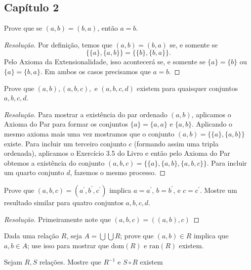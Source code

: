 \documentclass[a4paper]{article}
\begin{document}
\subsection{Capítulo 2}
\setcounter{theorem}{0}
\begin{exercicio}
Prove que se \((a,b)=(b,a)\), então \(a=b\).
\end{exercicio}
\begin{proof}[Resolução]
  Por definição, temos que \((a,b)=(b,a)\) se, e somente se
  \[\{\{a\},\{a,b\}\}=\{\{b\},\{b,a\}\}.\]
  Pelo Axioma da Extensionalidade, isso acontecerá se, e somente se
  \(\{a\}=\{b\}\) ou \(\{a\}=\{b,a\}\). Em ambos os casos precisamos que \(a=b\).
\end{proof}
\begin{exercicio}
  Prove que \((a,b),(a,b,c),\) e \((a,b,c,d)\) existem para quaisquer conjuntos \(a,b,c,d\).
\end{exercicio}
\begin{proof}[Resolução]
Para mostrar a existência do par ordenado \((a,b)\), aplicamos o Axioma do Par
para formar os conjuntos \(\{a\}=\{a,a\}\) e \(\{a,b\}\). Aplicando o mesmo
axioma mais uma vez mostramos que o conjunto \((a,b)=\{\{a\},\{a,b\}\}\) existe.
Para incluir um terceiro conjunto \(c\) (formando assim uma tripla ordenada),
aplicamos o Exercício 3.5 do Livro e então pelo Axioma do Par obtemos a
existência do conjunto \((a,b,c)=\{\{a\},\{a,b\},\{a,b,c\}\}\). Para incluir um quarto
conjunto \(d\), fazemos o mesmo processo.
\end{proof}
\begin{exercicio}
  Prove que \((a,b,c)=(a^\prime,b^\prime,c^\prime)\) implica \(a=a^\prime\),
  \(b=b^\prime\), e \(c=c^\prime\). Mostre um resultado similar para quatro
  conjuntos \(a,b,c,d\).
\end{exercicio}
\begin{proof}[Resolução]
Primeiramente note que \((a,b,c)=((a,b),c)\)   
\end{proof}
\begin{exercicio}
 Dada uma relação \(R\), seja \(A=\bigcup\bigcup R\); prove que \((a,b)\in R\)
 implica que \(a,b\in A\); use isso para mostrar que \(\text{dom}(R)\) e
 \(\text{ran}(R)\) existem.
\end{exercicio}
\begin{exercicio}
Sejam \(R, S\) relações. Mostre que \(R^{-1}\) e \(S\circ R\) existem
\end{exercicio}
\end{document}
